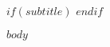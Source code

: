 \documentclass[11pt,letterpaper,twoside,]{article}
\begin{document}
\thispagestyle{empty}
\singlespacing

\vspace*{\fill}

$if(subtitle)$
$endif$

\vspace*{\fill}

$body$
\end{document}
